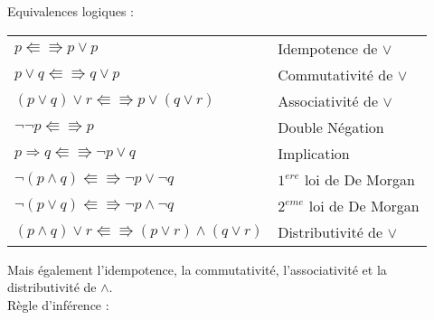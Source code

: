 		Equivalences logiques : 	
			\begin{center}
			\begin{tabular}{ll}
			$p \Lleftarrow \Rrightarrow p \lor p$ & Idempotence de $\lor$\\
			$p \lor q \Lleftarrow \Rrightarrow q \lor p$ & Commutativité de $\lor$\\
			$(p \lor q) \lor r \Lleftarrow \Rrightarrow p \lor (q \lor r)$ & Associativité de $\lor$\\
			$ \lnot \lnot p \Lleftarrow \Rrightarrow p$ & Double Négation\\
			$p \Rightarrow q \Lleftarrow \Rrightarrow \lnot p \lor q$ & Implication\\
			$\lnot (p \land q) \Lleftarrow \Rrightarrow \lnot p \lor \lnot q$ & $1^{ere}$ loi de De Morgan\\
			$\lnot (p \lor q) \Lleftarrow \Rrightarrow \lnot p \land \lnot q$ & $2^{eme}$ loi de De Morgan\\
			$(p \land q) \lor r \Lleftarrow \Rrightarrow (p \lor r) \land (q \lor r)$ & Distributivité de $\lor$\\
			\end{tabular}
			\end{center}
			Mais également l'idempotence, la commutativité, l'associativité et la distributivité de $\land$.\\
			
		Règle d'inférence : \\
		
